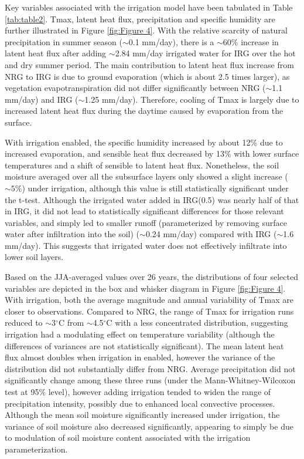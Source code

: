 \documentclass[draft,ms]{agutex}   %
\begin{document}
\begin{article}
Key variables associated with the irrigation model have been tabulated in Table \ref{tab:table2}. Tmax, latent heat flux, precipitation and specific humidity are further illustrated in Figure \ref{fig:Figure 4}. With the relative scarcity of natural precipitation in summer season ($\sim$0.1 mm/day), there is a $\sim$60\% increase in latent heat flux after adding $\sim$2.84 mm/day irrigated water for IRG over the hot and dry summer period. The main contribution to latent heat flux increase from NRG to IRG is due to ground evaporation (which is about 2.5 times larger), as vegetation evapotranspiration did not differ significantly between NRG ($\sim$1.1 mm/day) and IRG ($\sim$1.25 mm/day). Therefore, cooling of Tmax is largely due to increased latent heat flux during the daytime caused by evaporation from the surface. 

With irrigation enabled, the specific humidity increased by about 12$\%$ due to increased evaporation, and sensible heat flux decreased by 13\% with lower surface temperatures and a shift of sensible to latent heat flux. Nonetheless, the soil moisture averaged over all the subsurface layers only showed a slight increase ($\sim5\%$) under irrigation, although this value is still statistically significant under the t-test. Although the irrigated water added in IRG(0.5) was nearly half of that in IRG, it did not lead to statistically significant differences for those relevant variables, and simply led to smaller runoff (parameterized by removing surface water after infiltration into the soil) ($\sim$0.24 mm/day) compared with IRG ($\sim$1.6 mm/day). This suggests that irrigated water does not effectively infiltrate into lower soil layers.

Based on the JJA-averaged values over 26 years, the distributions of four selected variables are depicted in the box and whisker diagram in Figure \ref{fig:Figure 4}. With irrigation, both the average magnitude and annual variability of Tmax are closer to observations. Compared to NRG, the range of Tmax for irrigation runs reduced to $\sim$3$^\circ$C from $\sim$4.5$^\circ$C with a less concentrated distribution, suggesting irrigation had a modulating effect on temperature variability (although the differences of variances are not statistically significant). The mean latent heat flux almost doubles when irrigation in enabled, however the variance of the distribution did not substantially differ from NRG. Average precipitation did not significantly change among these three runs (under the Mann-Whitney-Wilcoxon test at 95\% level), however adding irrigation tended to widen the range of precipitation intensity, possibly due to enhanced local convective processes. Although the mean soil moisture significantly increased under irrigation, the variance of soil moisture also decreased significantly, appearing to simply be due to modulation of soil moisture content associated with the irrigation parameterization.


\end{article}
\end{document}
